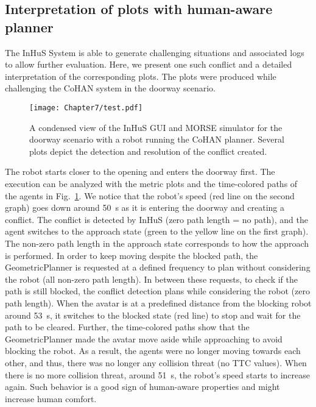 \subsection{Interpretation of plots with human-aware planner}

The InHuS System is able to generate challenging situations 
and associated logs to allow further evaluation.
Here, we present one such conflict and a detailed interpretation of the corresponding plots. The plots were produced while challenging the CoHAN system in the doorway scenario.

\begin{figure}
    \centering
    \texttt{[image: Chapter7/test.pdf]}
    
    \caption{
    A condensed view of the InHuS GUI and MORSE simulator for the doorway scenario with a robot running the CoHAN planner. Several plots depict the detection and resolution of the conflict created. 
    }
    \label{fig:cohan_passage_block}
    \vspace{-0.3cm}
\end{figure}


The robot starts closer to the opening and enters the doorway first. The execution can be analyzed with the metric plots and the time-colored paths of the agents in Fig.~\ref{fig:cohan_passage_block}. We notice that the robot's speed (red line on the second graph) goes down around \SI{50}{\second} as it is entering the doorway and creating a conflict. The conflict is detected by InHuS (zero path length = no path), and the agent switches to the approach state (green to the yellow line on the first graph).
The non-zero path length in the approach state corresponds to how the approach is performed. In order to keep moving despite the blocked path, the GeometricPlanner is requested at a defined frequency to plan without considering the robot (all non-zero path length). In between these requests, to check if the path is still blocked, the conflict detection plans while considering the robot (zero path length). When the avatar is at a predefined distance from the blocking robot around \SI{53}{\second}, it switches to the blocked state (red line) to stop and wait for the path to be cleared. Further, the time-colored paths show that the GeometricPlanner made the avatar move aside while approaching to avoid blocking the robot. As a result, the agents were no longer moving towards each other, and thus, there was no longer any collision threat (no TTC values). When there is no more collision threat, around \SI{51}{\second}, the robot's speed starts to increase again. Such behavior is a good sign of human-aware properties and might increase human comfort.


